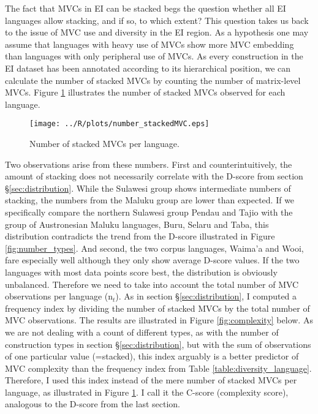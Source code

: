 The fact that MVCs in EI can be stacked begs the question whether all EI languages allow stacking, and if so, to which extent? This question takes us back to the issue of MVC use and diversity in the EI region. As a hypothesis one may assume that languages with heavy use of MVCs show more MVC embedding than languages with only peripheral use of MVCs. As every construction in the EI dataset has been annotated according to its hierarchical position, we can calculate the number of stacked MVCs by counting the number of matrix-level MVCs. Figure \ref{fig:stacked} illustrates the number of stacked MVCs observed for each language.

\begin{figure}
\texttt{[image: ../R/plots/number\_stackedMVC.eps]}
\caption[Number of stacked MVCs per language]{Number of stacked MVCs per language.}\label{fig:stacked}
\end{figure}


Two observations arise from these numbers. First and counterintuitively, the amount of stacking does not necessarily correlate with the D-score from section §\ref{sec:distribution}. While the Sulawesi group shows intermediate numbers of stacking, the numbers from the Maluku group are lower than expected. If we specifically compare the northern Sulawesi group Pendau and Tajio with the group of Austronesian Maluku languages, Buru, Selaru and Taba, this distribution contradicts the trend from the D-score illustrated in Figure \ref{fig:number_types}. And second, the two corpus languages, Waima'a and Wooi, fare especially well although they only show average D-score values. If the two languages with most data points score best, the distribution is obviously unbalanced. Therefore we need to take into account the total number of MVC observations per language (n$_t$). As in section §\ref{sec:distribution}, I computed a frequency index by dividing the number of stacked MVCs by the total number of MVC observations. The results are illustrated in Figure \ref{fig:complexity} below. As we are not dealing with a count of different types, as with the number of construction types in section §\ref{sec:distribution}, but with the sum of observations of one particular value (=stacked), this index arguably is a better predictor of MVC complexity than the frequency index from Table \ref{table:diversity_language}. Therefore, I used this index instead of the mere number of stacked MVCs per language, as illustrated in Figure \ref{fig:stacked}. I call it the C-score (complexity score), analogous to the D-score from the last section.

